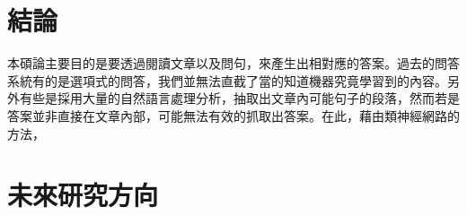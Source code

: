 \section{結論}
本碩論主要目的是要透過閱讀文章以及問句，來產生出相對應的答案。過去的問答系統有的是選項式的問答，我們並無法直截了當的知道機器究竟學習到的內容。另外有些是採用大量的自然語言處理分析，抽取出文章內可能句子的段落，然而若是答案並非直接在文章內部，可能無法有效的抓取出答案。在此，藉由類神經網路的方法，
\section{未來研究方向}
